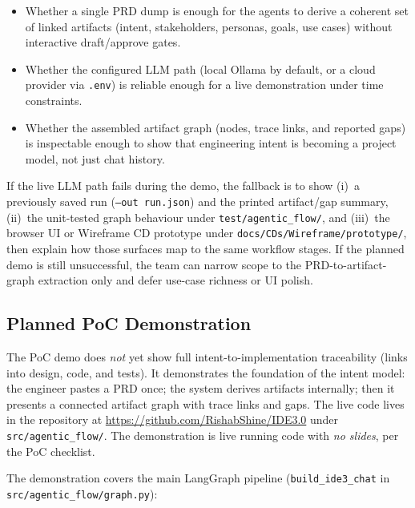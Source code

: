 \documentclass{article}
\begin{document}
\begin{itemize}
  \item Whether a single PRD dump is enough for the agents to derive a coherent
    set of linked artifacts (intent, stakeholders, personas, goals, use cases)
    without interactive draft/approve gates.
  \item Whether the configured LLM path (local Ollama by default, or a cloud
    provider via \texttt{.env}) is reliable enough for a live demonstration
    under time constraints.
  \item Whether the assembled artifact graph (nodes, trace links, and reported
    gaps) is inspectable enough to show that engineering intent is becoming a
    project model, not just chat history.
\end{itemize}

If the live LLM path fails during the demo, the fallback is to show (i)~a
previously saved run (\texttt{--out run.json}) and the printed artifact/gap
summary, (ii)~the unit-tested graph behaviour under
\texttt{test/agentic\_flow/}, and (iii)~the browser UI or Wireframe CD prototype
under \texttt{docs/CDs/Wireframe/prototype/}, then explain how those surfaces
map to the same workflow stages. If the planned demo is still unsuccessful, the
team can narrow scope to the PRD-to-artifact-graph extraction only and defer
use-case richness or UI polish.

\subsection{Planned PoC Demonstration}

The PoC demo does \emph{not} yet show full intent-to-implementation
traceability (links into design, code, and tests). It demonstrates the
foundation of the intent model: the engineer pastes a PRD once; the system
derives artifacts internally; then it presents a connected artifact graph with
trace links and gaps. The live code lives in the repository at
\url{https://github.com/RishabShine/IDE3.0} under \texttt{src/agentic\_flow/}.
The demonstration is live running code with \emph{no slides}, per the PoC
checklist.

The demonstration covers the main LangGraph pipeline
(\texttt{build\_ide3\_chat} in \texttt{src/agentic\_flow/graph.py}):
\end{document}

